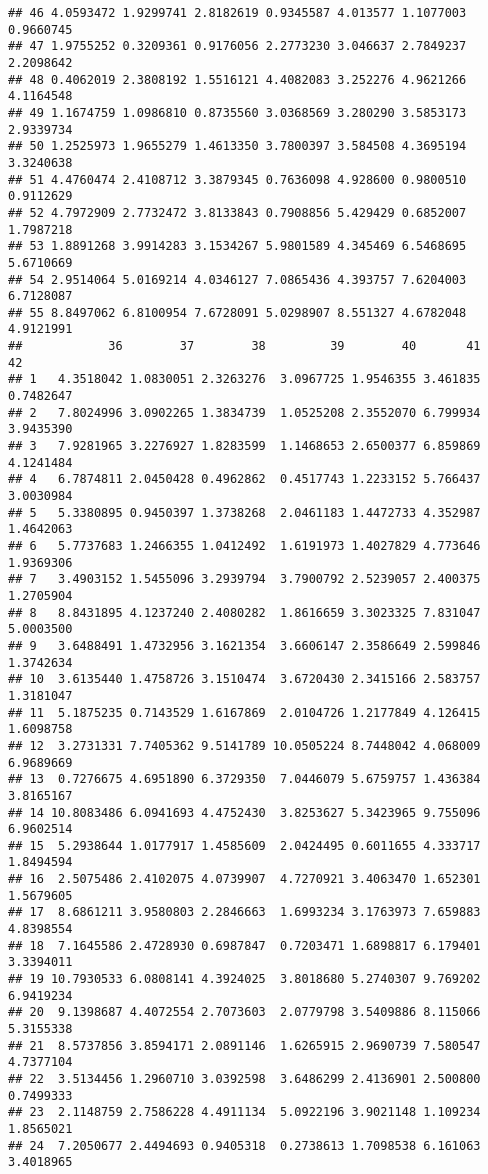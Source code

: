 \documentclass[
]{article}
\begin{document}
\begin{verbatim}
## 46 4.0593472 1.9299741 2.8182619 0.9345587 4.013577 1.1077003 0.9660745
## 47 1.9755252 0.3209361 0.9176056 2.2773230 3.046637 2.7849237 2.2098642
## 48 0.4062019 2.3808192 1.5516121 4.4082083 3.252276 4.9621266 4.1164548
## 49 1.1674759 1.0986810 0.8735560 3.0368569 3.280290 3.5853173 2.9339734
## 50 1.2525973 1.9655279 1.4613350 3.7800397 3.584508 4.3695194 3.3240638
## 51 4.4760474 2.4108712 3.3879345 0.7636098 4.928600 0.9800510 0.9112629
## 52 4.7972909 2.7732472 3.8133843 0.7908856 5.429429 0.6852007 1.7987218
## 53 1.8891268 3.9914283 3.1534267 5.9801589 4.345469 6.5468695 5.6710669
## 54 2.9514064 5.0169214 4.0346127 7.0865436 4.393757 7.6204003 6.7128087
## 55 8.8497062 6.8100954 7.6728091 5.0298907 8.551327 4.6782048 4.9121991
##            36        37        38         39        40       41        42
## 1   4.3518042 1.0830051 2.3263276  3.0967725 1.9546355 3.461835 0.7482647
## 2   7.8024996 3.0902265 1.3834739  1.0525208 2.3552070 6.799934 3.9435390
## 3   7.9281965 3.2276927 1.8283599  1.1468653 2.6500377 6.859869 4.1241484
## 4   6.7874811 2.0450428 0.4962862  0.4517743 1.2233152 5.766437 3.0030984
## 5   5.3380895 0.9450397 1.3738268  2.0461183 1.4472733 4.352987 1.4642063
## 6   5.7737683 1.2466355 1.0412492  1.6191973 1.4027829 4.773646 1.9369306
## 7   3.4903152 1.5455096 3.2939794  3.7900792 2.5239057 2.400375 1.2705904
## 8   8.8431895 4.1237240 2.4080282  1.8616659 3.3023325 7.831047 5.0003500
## 9   3.6488491 1.4732956 3.1621354  3.6606147 2.3586649 2.599846 1.3742634
## 10  3.6135440 1.4758726 3.1510474  3.6720430 2.3415166 2.583757 1.3181047
## 11  5.1875235 0.7143529 1.6167869  2.0104726 1.2177849 4.126415 1.6098758
## 12  3.2731331 7.7405362 9.5141789 10.0505224 8.7448042 4.068009 6.9689669
## 13  0.7276675 4.6951890 6.3729350  7.0446079 5.6759757 1.436384 3.8165167
## 14 10.8083486 6.0941693 4.4752430  3.8253627 5.3423965 9.755096 6.9602514
## 15  5.2938644 1.0177917 1.4585609  2.0424495 0.6011655 4.333717 1.8494594
## 16  2.5075486 2.4102075 4.0739907  4.7270921 3.4063470 1.652301 1.5679605
## 17  8.6861211 3.9580803 2.2846663  1.6993234 3.1763973 7.659883 4.8398554
## 18  7.1645586 2.4728930 0.6987847  0.7203471 1.6898817 6.179401 3.3394011
## 19 10.7930533 6.0808141 4.3924025  3.8018680 5.2740307 9.769202 6.9419234
## 20  9.1398687 4.4072554 2.7073603  2.0779798 3.5409886 8.115066 5.3155338
## 21  8.5737856 3.8594171 2.0891146  1.6265915 2.9690739 7.580547 4.7377104
## 22  3.5134456 1.2960710 3.0392598  3.6486299 2.4136901 2.500800 0.7499333
## 23  2.1148759 2.7586228 4.4911134  5.0922196 3.9021148 1.109234 1.8565021
## 24  7.2050677 2.4494693 0.9405318  0.2738613 1.7098538 6.161063 3.4018965

\end{verbatim}
\end{document}
